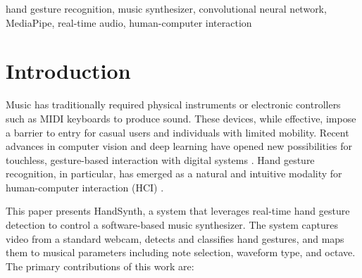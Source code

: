 \documentclass[conference]{IEEEtran}
\begin{document}
\begin{abstract}
This paper presents HandSynth, a real-time hand gesture controlled music synthesizer that enables users to play musical notes and control sound parameters using natural hand movements captured through a standard webcam. The system employs Google MediaPipe for hand landmark detection and supports two gesture classification modes: a rule-based finger counting approach and a lightweight Convolutional Neural Network (CNN) trained on a custom dataset. Detected gestures are mapped to a pentatonic musical scale, with the right hand selecting melody notes and the left hand controlling waveform type and octave. Audio synthesis is performed in real time using NumPy-generated waveforms (sine, square, and sawtooth) played through a continuous audio stream. The graphical user interface is built with PyQt6 and provides live webcam feedback, gesture status, and synthesizer controls. Experimental results demonstrate that the CNN model achieves high classification accuracy across six gesture classes (0--5 fingers) with inference latency under 5 ms using TensorFlow Lite quantization, enabling smooth real-time performance at 30 frames per second on consumer-grade hardware.
\end{abstract}

\begin{IEEEkeywords}
hand gesture recognition, music synthesizer, convolutional neural network, MediaPipe, real-time audio, human-computer interaction
\end{IEEEkeywords}

\section{Introduction}

Music has traditionally required physical instruments or electronic controllers such as MIDI keyboards to produce sound. These devices, while effective, impose a barrier to entry for casual users and individuals with limited mobility. Recent advances in computer vision and deep learning have opened new possibilities for touchless, gesture-based interaction with digital systems \cite{mitra2007gesture}. Hand gesture recognition, in particular, has emerged as a natural and intuitive modality for human-computer interaction (HCI) \cite{rautaray2015vision}.

This paper presents HandSynth, a system that leverages real-time hand gesture detection to control a software-based music synthesizer. The system captures video from a standard webcam, detects and classifies hand gestures, and maps them to musical parameters including note selection, waveform type, and octave. The primary contributions of this work are:
\end{document}

